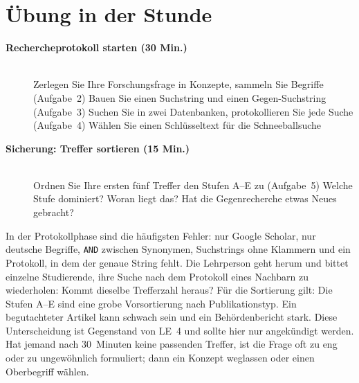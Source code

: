 \section{Übung in der Stunde}
\begin{description}
\item[{\rot\bf Rechercheprotokoll starten (30 Min.)}]~\\[-\lblskip]
\bi
  \ite Zerlegen Sie Ihre Forschungsfrage in Konzepte, sammeln Sie Begriffe
    (Aufgabe~2)
  \ite Bauen Sie einen Suchstring und einen Gegen-Suchstring (Aufgabe~3)
  \ite Suchen Sie in zwei Datenbanken, protokollieren Sie jede Suche
    (Aufgabe~4)
  \ite Wählen Sie einen Schlüsseltext für die Schneeballsuche
\ei
\os{\newpage}

\item[{\rot\bf Sicherung: Treffer sortieren (15 Min.)}]~\\[-\lblskip]
\bi
  \ite Ordnen Sie Ihre ersten fünf Treffer den Stufen A--E zu
    (Aufgabe~5)
  \ite Welche Stufe dominiert? Woran liegt das?
  \ite Hat die Gegenrecherche etwas Neues gebracht?
\ei
\os{\newpage}
\end{description}

\begin{lehrhinweis}
In der Protokollphase sind die häufigsten Fehler: nur Google Scholar, nur
deutsche Begriffe, \texttt{AND} zwischen Synonymen, Suchstrings ohne
Klammern und ein Protokoll, in dem der genaue String fehlt. Die Lehrperson
geht herum und bittet einzelne Studierende, ihre Suche nach dem Protokoll
eines Nachbarn zu wiederholen: Kommt dieselbe Trefferzahl heraus? Für die
Sortierung gilt: Die Stufen A--E sind eine grobe Vorsortierung nach
Publikationstyp. Ein begutachteter Artikel kann schwach sein und ein
Behördenbericht stark. Diese Unterscheidung ist Gegenstand von LE~4 und
sollte hier nur angekündigt werden. Hat jemand nach 30~Minuten keine
passenden Treffer, ist die Frage oft zu eng oder zu ungewöhnlich formuliert;
dann ein Konzept weglassen oder einen Oberbegriff wählen.
\end{lehrhinweis}

